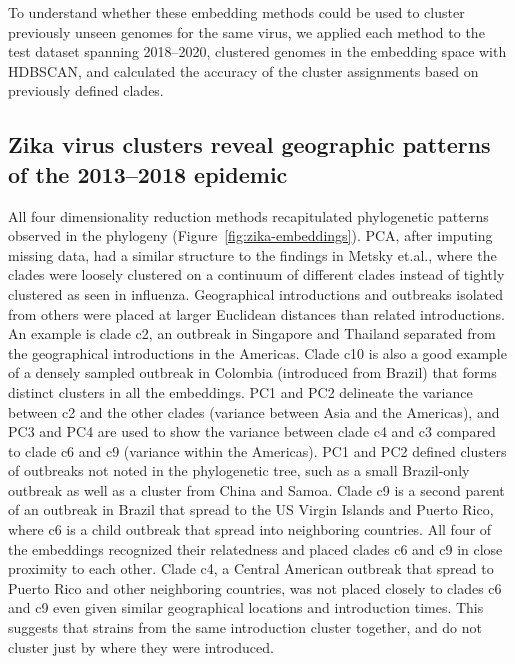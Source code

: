 \documentclass[9pt,lineno]{elife}
\begin{document}
To understand whether these embedding methods could be used to cluster previously unseen genomes for the same virus, we applied each method to the test dataset spanning 2018--2020, clustered genomes in the embedding space with HDBSCAN, and calculated the accuracy of the cluster assignments based on previously defined clades.

\subsection*{Zika virus clusters reveal geographic patterns of the 2013--2018 epidemic}

All four dimensionality reduction methods recapitulated phylogenetic patterns observed in the phylogeny (Figure~\ref{fig:zika-embeddings}).
PCA, after imputing missing data, had a similar structure to the findings in Metsky et.al., where the clades were loosely clustered on a continuum of different clades instead of tightly clustered as seen in influenza.
Geographical introductions and outbreaks isolated from others were placed at larger Euclidean distances than related introductions.
An example is clade c2, an outbreak in Singapore and Thailand separated from the geographical introductions in the Americas.
Clade c10 is also a good example of a densely sampled outbreak in Colombia (introduced from Brazil) that forms distinct clusters in all the embeddings.
PC1 and PC2 delineate the variance between c2 and the other clades (variance between Asia and the Americas), and PC3 and PC4 are used to show the variance between clade c4 and c3 compared to clade c6 and c9 (variance within the Americas).
PC1 and PC2 defined clusters of outbreaks not noted in the phylogenetic tree, such as a small Brazil-only outbreak as well as a cluster from China and Samoa.
Clade c9 is a second parent of an outbreak in Brazil that spread to the US Virgin Islands and Puerto Rico, where c6 is a child outbreak that spread into neighboring countries.
All four of the embeddings recognized their relatedness and placed clades c6 and c9 in close proximity to each other.
Clade c4, a Central American outbreak that spread to Puerto Rico and other neighboring countries, was not placed closely to clades c6 and c9 even given similar geographical locations and introduction times.
This suggests that strains from the same introduction cluster together, and do not cluster just by where they were introduced.
\end{document}
